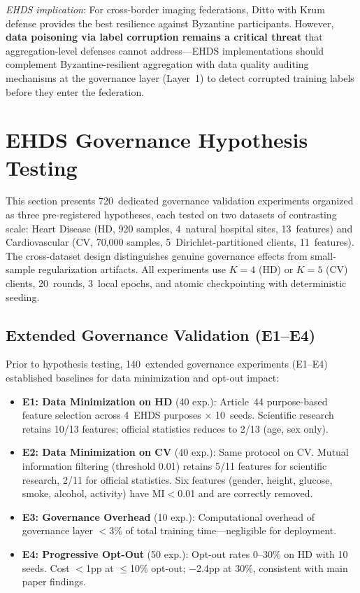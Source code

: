 \documentclass[conference]{IEEEtran}
\begin{document}
\textit{EHDS implication}: For cross-border imaging federations, Ditto with Krum defense provides the best resilience against Byzantine participants. However, \textbf{data poisoning via label corruption remains a critical threat} that aggregation-level defenses cannot address---EHDS implementations should complement Byzantine-resilient aggregation with data quality auditing mechanisms at the governance layer (Layer~1) to detect corrupted training labels before they enter the federation.


\section{EHDS Governance Hypothesis Testing}
\label{app:governance}
\label{sec:governance_hypotheses}

This section presents 720~dedicated governance validation experiments organized as three pre-registered hypotheses, each tested on two datasets of contrasting scale: Heart Disease (HD, 920 samples, 4~natural hospital sites, 13~features) and Cardiovascular (CV, 70,000 samples, 5~Dirichlet-partitioned clients, 11~features). The cross-dataset design distinguishes genuine governance effects from small-sample regularization artifacts. All experiments use $K{=}4$ (HD) or $K{=}5$ (CV) clients, 20~rounds, 3~local epochs, and atomic checkpointing with deterministic seeding.

\subsection{Extended Governance Validation (E1--E4)}
\label{sec:governance_e1e4}

Prior to hypothesis testing, 140~extended governance experiments (E1--E4) established baselines for data minimization and opt-out impact:

\begin{itemize}
    \item \textbf{E1: Data Minimization on HD} (40 exp.): Article~44 purpose-based feature selection across 4~EHDS purposes $\times$ 10~seeds. Scientific research retains 10/13 features; official statistics reduces to 2/13 (age, sex only).
    \item \textbf{E2: Data Minimization on CV} (40 exp.): Same protocol on CV. Mutual information filtering (threshold 0.01) retains 5/11 features for scientific research, 2/11 for official statistics. Six features (gender, height, glucose, smoke, alcohol, activity) have MI${<}$0.01 and are correctly removed.
    \item \textbf{E3: Governance Overhead} (10 exp.): Computational overhead of governance layer $<$3\% of total training time---negligible for deployment.
    \item \textbf{E4: Progressive Opt-Out} (50 exp.): Opt-out rates 0--30\% on HD with 10 seeds. Cost $<$1pp at $\leq$10\% opt-out; $-$2.4pp at 30\%, consistent with main paper findings.
\end{itemize}
\end{document}
